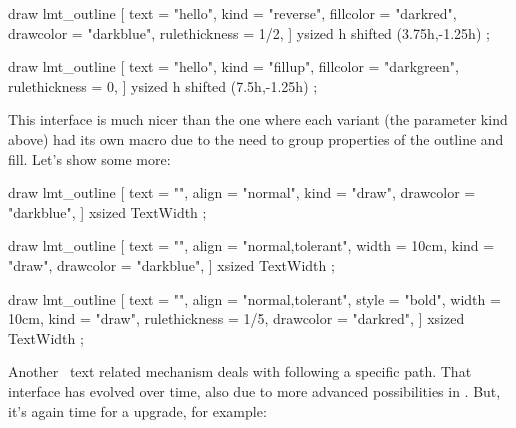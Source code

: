     draw lmt_outline [
        text          = "hello",
        kind          = "reverse",
        fillcolor     = "darkred",
        drawcolor     = "darkblue",
        rulethickness = 1/2,
    ] ysized h shifted (3.75h,-1.25h) ;

    draw lmt_outline [
        text          = "hello",
        kind          = "fillup",
        fillcolor     = "darkgreen",
        rulethickness = 0,
    ] ysized h shifted (7.5h,-1.25h) ;
\stopMPcode
\stopbuffer

\typebuffer[option=TEX]

\startlinecorrection
\getbuffer
\stoplinecorrection

This interface is much nicer than the one where each variant (the parameter \type
{kind} above) had its own macro due to the need to group properties of the
outline and fill. Let's show some more:

\startbuffer
{}
    draw lmt_outline [
        text      = "\obeydiscretionaries{}",
        align     = "normal",
        kind      = "draw",
        drawcolor = "darkblue",
    ] xsized TextWidth ;
\stopMPcode
\stopbuffer

\typebuffer[option=TEX]

\startlinecorrection
\getbuffer
\stoplinecorrection

\startbuffer
{}
    draw lmt_outline [
        text      = "\obeydiscretionaries{}",
        align     = "normal,tolerant",
        width     = 10cm,
        kind      = "draw",
        drawcolor = "darkblue",
    ] xsized TextWidth ;
\stopMPcode
\stopbuffer

\typebuffer[option=TEX]

\startlinecorrection
\getbuffer
\stoplinecorrection

\startbuffer
{}
    draw lmt_outline [
        text          = "\obeydiscretionaries{}",
        align         = "normal,tolerant",
        style         = "bold",
        width         = 10cm,
        kind          = "draw",
        rulethickness = 1/5,
        drawcolor     = "darkred",
    ] xsized TextWidth ;
\stopMPcode
\stopbuffer

\typebuffer[option=TEX]

\startlinecorrection
\getbuffer
\stoplinecorrection

Another \METAFUN\ text related mechanism deals with following a specific path.
That interface has evolved over time, also due to more advanced possibilities in
\MKIV. But, it's again time for a upgrade, for example:

